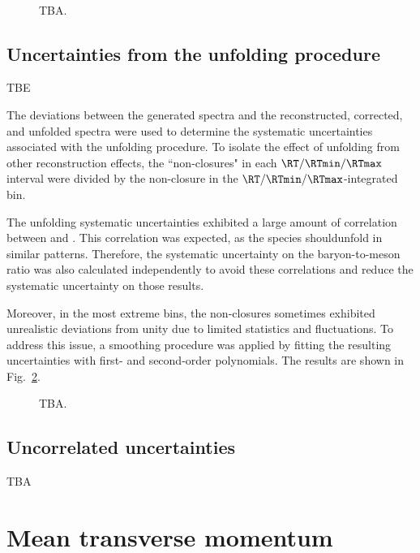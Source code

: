 \begin{figure}%
\\
\caption{TBA.}
\label{fig:rt:systLbar}
\end{figure}

\subsection{Uncertainties from the unfolding procedure}

TBE

The deviations between the generated \pt spectra and the reconstructed, corrected, and unfolded \pt spectra were used to determine the systematic uncertainties associated with the unfolding procedure. To isolate the effect of unfolding from other reconstruction effects, the ``non-closures" in each $\RT/\RTmin/\RTmax$ interval were divided by the non-closure in the $\RT/\RTmin/\RTmax$-integrated bin.

The unfolding systematic uncertainties exhibited a large amount of correlation between \KOs and \LA. This correlation was expected, as the \VO species shouldunfold in similar patterns. Therefore, the systematic uncertainty on the baryon-to-meson ratio was also calculated independently to avoid these correlations and reduce the systematic uncertainty on those results.

Moreover, in the most extreme bins, the non-closures sometimes exhibited unrealistic deviations from unity due to limited statistics and fluctuations. To address this issue, a smoothing procedure was applied by fitting the resulting uncertainties with first- and second-order polynomials. The results are shown in Fig.~\ref{fig:rt:systUnf}.

\begin{figure}%
\caption{TBA.}
\label{fig:rt:systUnf}
\end{figure}

\subsection{Uncorrelated uncertainties}

TBA

\section{Mean transverse momentum}


